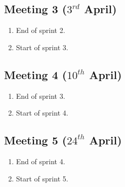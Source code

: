 \subsection{Meeting 3 ($3^{rd}$ April)}
\begin{enumerate}
	\item End of sprint 2.
	\item Start of sprint 3.
\end{enumerate}

\subsection{Meeting 4 ($10^{th}$ April)}
\begin{enumerate}
	\item End of sprint 3.
	\item Start of sprint 4.
\end{enumerate}

\subsection{Meeting 5 ($24^{th}$ April)}
\begin{enumerate}
	\item End of sprint 4.
	\item Start of sprint 5.
\end{enumerate}
